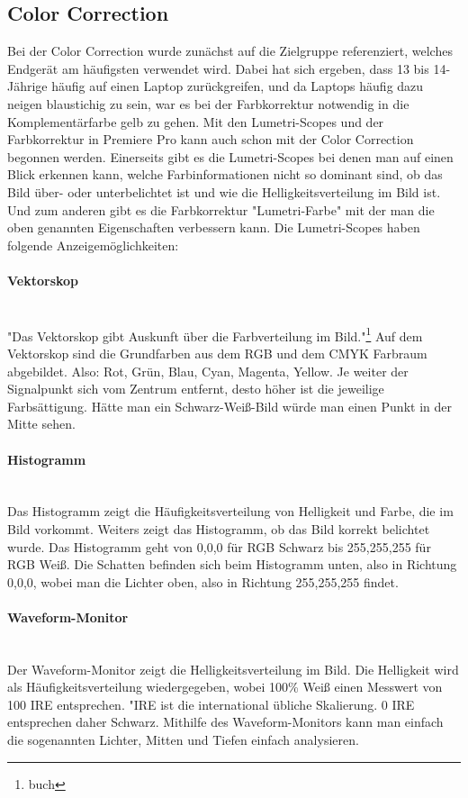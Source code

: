 \subsection{Color Correction}
Bei der Color Correction wurde zunächst auf die Zielgruppe referenziert, welches Endgerät am häufigsten verwendet wird. Dabei hat sich ergeben, dass 13 bis 14-Jährige häufig auf einen Laptop zurückgreifen, und da Laptops häufig dazu neigen blaustichig zu sein, war es bei der Farbkorrektur notwendig in die Komplementärfarbe gelb zu gehen.\newline
Mit den Lumetri-Scopes und der Farbkorrektur in Premiere Pro kann auch schon mit der Color Correction begonnen werden. Einerseits gibt es die Lumetri-Scopes bei denen man auf einen Blick erkennen kann, welche Farbinformationen nicht so dominant sind, ob das Bild über- oder unterbelichtet ist und wie die Helligkeitsverteilung im Bild ist. Und zum anderen gibt es die Farbkorrektur "Lumetri-Farbe" mit der man die oben genannten Eigenschaften verbessern kann.\newline
Die Lumetri-Scopes haben folgende Anzeigemöglichkeiten: 
\paragraph{Vektorskop}
\leavevmode \\
"Das Vektorskop gibt Auskunft über die Farbverteilung im Bild."\footnote{\label{}buch} Auf dem Vektorskop sind die Grundfarben aus dem RGB und dem CMYK Farbraum abgebildet. Also: Rot, Grün, Blau, Cyan, Magenta, Yellow. Je weiter der Signalpunkt sich vom Zentrum entfernt, desto höher ist die jeweilige Farbsättigung. Hätte man ein Schwarz-Weiß-Bild würde man einen Punkt in der Mitte sehen.
\paragraph{Histogramm}
\leavevmode \\
Das Histogramm zeigt die Häufigkeitsverteilung von Helligkeit und Farbe, die im Bild vorkommt. Weiters zeigt das Histogramm, ob das Bild korrekt belichtet wurde. Das Histogramm geht von 0,0,0 für RGB Schwarz bis 255,255,255 für RGB Weiß. Die Schatten befinden sich beim Histogramm unten, also in Richtung 0,0,0, wobei man die Lichter oben, also in Richtung 255,255,255 findet.
\paragraph{Waveform-Monitor}
\leavevmode \\
Der Waveform-Monitor zeigt die Helligkeitsverteilung im Bild. Die Helligkeit wird als Häufigkeitsverteilung wiedergegeben, wobei 100\% Weiß einen Messwert von 100 IRE entsprechen. "IRE ist die international übliche Skalierung. 0 IRE entsprechen daher Schwarz. Mithilfe des Waveform-Monitors kann man einfach die sogenannten Lichter, Mitten und Tiefen einfach analysieren.
